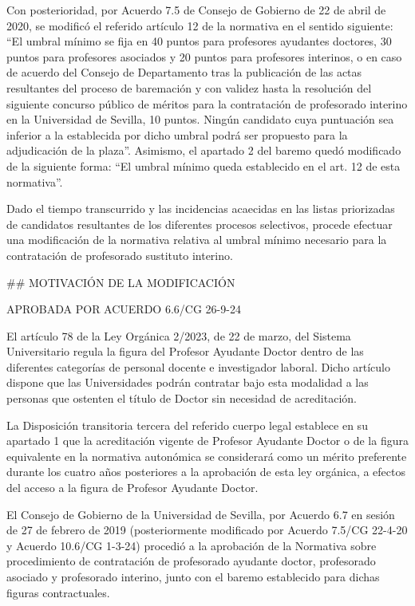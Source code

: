 \documentclass{article}
\begin{document}
\begin{itemize}
\begin{itemize}
\begin{scriptsize}
                  Con posterioridad, por Acuerdo 7.5 de Consejo de Gobierno de 22 de abril de 2020, se modificó el referido artículo 12 de la normativa en el sentido siguiente: “El umbral mínimo se fija en 40 puntos para profesores ayudantes doctores, 30 puntos para profesores asociados y 20 puntos para profesores interinos, o en caso de acuerdo del Consejo de Departamento tras la publicación de las actas resultantes del proceso de baremación y con validez hasta la resolución del siguiente concurso público de méritos para la contratación de profesorado interino en la Universidad de Sevilla, 10 puntos. Ningún candidato cuya puntuación sea inferior a la establecida por dicho umbral podrá ser propuesto para la adjudicación de la plaza”. Asimismo, el apartado 2 del baremo quedó modificado de la siguiente forma: “El umbral mínimo queda establecido en el art. 12 de esta normativa”.

                  Dado el tiempo transcurrido y las incidencias acaecidas en las listas priorizadas de candidatos resultantes de los diferentes procesos selectivos, procede efectuar una modificación de la normativa relativa al umbral mínimo necesario para la contratación de profesorado sustituto interino.

                  \#\# MOTIVACIÓN DE LA MODIFICACIÓN

                  APROBADA POR ACUERDO 6.6/CG 26-9-24

                  El artículo 78 de la Ley Orgánica 2/2023, de 22 de marzo, del Sistema Universitario regula la figura del Profesor Ayudante Doctor dentro de las diferentes categorías de personal docente e investigador laboral. Dicho artículo dispone que las Universidades podrán contratar bajo esta modalidad a las personas que ostenten el título de Doctor sin necesidad de acreditación.

                  La Disposición transitoria tercera del referido cuerpo legal establece en su apartado 1 que la acreditación vigente de Profesor Ayudante Doctor o de la figura equivalente en la normativa autonómica se considerará como un mérito preferente durante los cuatro años posteriores a la aprobación de esta ley orgánica, a efectos del acceso a la figura de Profesor Ayudante Doctor.

                  El Consejo de Gobierno de la Universidad de Sevilla, por Acuerdo 6.7 en sesión de 27 de febrero de 2019 (posteriormente modificado por Acuerdo 7.5/CG 22-4-20 y Acuerdo 10.6/CG 1-3-24) procedió a la aprobación de la Normativa sobre procedimiento de contratación de profesorado ayudante doctor, profesorado asociado y profesorado interino, junto con el baremo establecido para dichas figuras contractuales.


\end{scriptsize}
\end{itemize}
\end{itemize}
\end{document}
